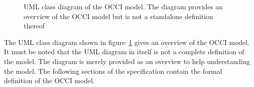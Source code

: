 \documentclass[10pt,a4paper,british]{article}
\begin{document}
\begin{figure}[!h]
{\centering {} \par}
\caption{UML class diagram of the OCCI model. The diagram provides an
overview of the OCCI model but is not a standalone definition thereof}
\label{fig:occi_model}
\end{figure}

The UML class diagram shown in figure~\ref{fig:occi_model} gives an overview of
the OCCI model. It must be noted that the UML diagram in itself is not a
complete definition of the model. The diagram is merely provided as an overview
to help understanding the model.  The following sections of the specification
contain the formal definition of the OCCI model.
\end{document}

